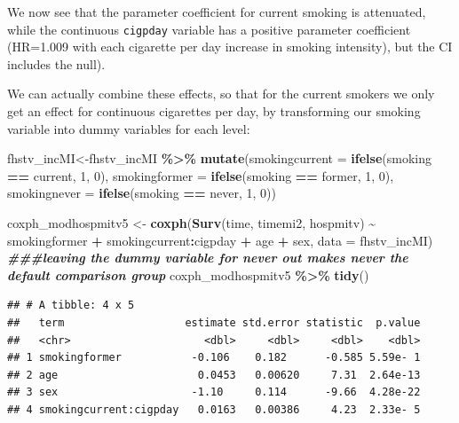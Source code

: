 \documentclass[
]{book}
\newenvironment{Shaded}{\begin{snugshade}}{\end{snugshade}}
\newcommand{\AttributeTok}[1]{\textcolor[rgb]{0.13,0.29,0.53}{#1}}
\newcommand{\DecValTok}[1]{\textcolor[rgb]{0.00,0.00,0.81}{#1}}
\newcommand{\DocumentationTok}[1]{\textcolor[rgb]{0.56,0.35,0.01}{\textbf{\textit{#1}}}}
\newcommand{\FunctionTok}[1]{\textcolor[rgb]{0.13,0.29,0.53}{\textbf{#1}}}
\newcommand{\NormalTok}[1]{#1}
\newcommand{\OtherTok}[1]{\textcolor[rgb]{0.56,0.35,0.01}{#1}}
\newcommand{\SpecialCharTok}[1]{\textcolor[rgb]{0.81,0.36,0.00}{\textbf{#1}}}
\newcommand{\StringTok}[1]{\textcolor[rgb]{0.31,0.60,0.02}{#1}}
\begin{document}
We now see that the parameter coefficient for current smoking is attenuated, while the continuous \texttt{cigpday} variable has a positive parameter coefficient (HR=1.009 with each cigarette per day increase in smoking intensity), but the CI includes the null).

We can actually combine these effects, so that for the current smokers we only get an effect for continuous cigarettes per day, by transforming our smoking variable into dummy variables for each level:

\begin{Shaded}
\begin{Highlighting}[]
\NormalTok{fhstv\_incMI}\OtherTok{\textless{}{-}}\NormalTok{fhstv\_incMI }\SpecialCharTok{\%\textgreater{}\%}
  \FunctionTok{mutate}\NormalTok{(}\AttributeTok{smokingcurrent =} \FunctionTok{ifelse}\NormalTok{(smoking }\SpecialCharTok{==} \StringTok{\textquotesingle{}current\textquotesingle{}}\NormalTok{, }\DecValTok{1}\NormalTok{, }\DecValTok{0}\NormalTok{),}
         \AttributeTok{smokingformer =} \FunctionTok{ifelse}\NormalTok{(smoking }\SpecialCharTok{==} \StringTok{\textquotesingle{}former\textquotesingle{}}\NormalTok{, }\DecValTok{1}\NormalTok{, }\DecValTok{0}\NormalTok{),}
         \AttributeTok{smokingnever =} \FunctionTok{ifelse}\NormalTok{(smoking }\SpecialCharTok{==} \StringTok{\textquotesingle{}never\textquotesingle{}}\NormalTok{, }\DecValTok{1}\NormalTok{, }\DecValTok{0}\NormalTok{))}

\NormalTok{coxph\_modhospmitv5 }\OtherTok{\textless{}{-}} \FunctionTok{coxph}\NormalTok{(}\FunctionTok{Surv}\NormalTok{(time, timemi2, hospmitv) }\SpecialCharTok{\textasciitilde{}} 
\NormalTok{                              smokingformer }\SpecialCharTok{+}\NormalTok{ smokingcurrent}\SpecialCharTok{:}\NormalTok{cigpday }\SpecialCharTok{+}\NormalTok{ age }\SpecialCharTok{+}\NormalTok{ sex,}
                            \AttributeTok{data =}\NormalTok{ fhstv\_incMI) }\DocumentationTok{\#\#\#leaving the dummy variable for \textquotesingle{}never\textquotesingle{} out makes \textquotesingle{}never\textquotesingle{} the default comparison group}
\NormalTok{coxph\_modhospmitv5 }\SpecialCharTok{\%\textgreater{}\%}
  \FunctionTok{tidy}\NormalTok{()}
\end{Highlighting}
\end{Shaded}

\begin{verbatim}
## # A tibble: 4 x 5
##   term                   estimate std.error statistic  p.value
##   <chr>                     <dbl>     <dbl>     <dbl>    <dbl>
## 1 smokingformer           -0.106    0.182      -0.585 5.59e- 1
## 2 age                      0.0453   0.00620     7.31  2.64e-13
## 3 sex                     -1.10     0.114      -9.66  4.28e-22
## 4 smokingcurrent:cigpday   0.0163   0.00386     4.23  2.33e- 5
\end{verbatim}
\end{document}
